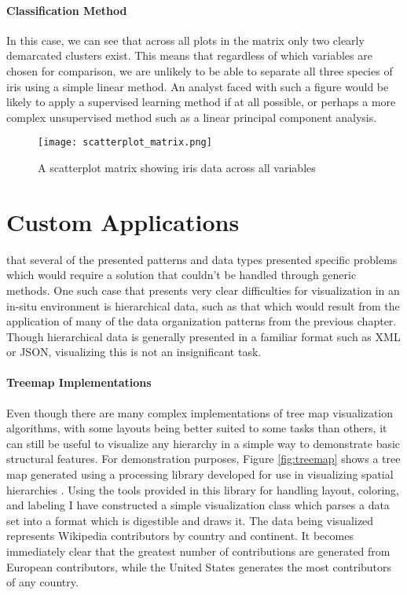 \paragraph{Classification Method}
In this case, we can see that across all plots in the matrix only two clearly demarcated clusters exist. This means that regardless of which variables are chosen for comparison, we are unlikely to be able to separate all three species of iris using a simple linear method. An analyst faced with such a figure would be likely to apply a supervised learning method if at all possible, or perhaps a more complex unsupervised method such as a linear principal component analysis. 

\begin{figure}
	\centering
	\texttt{[image: scatterplot\_matrix.png]}
	\caption{A scatterplot matrix showing iris data across all variables}
	\label{fig:scatterplot_matrix}
\end{figure}

\section{Custom Applications}
 that several of the presented patterns and data types presented specific problems which would require a solution that couldn't be handled through generic methods. One such case that presents very clear difficulties for visualization in an in-situ environment is hierarchical data, such as that which would result from the application of many of the data organization patterns from the previous chapter. Though hierarchical data is generally presented  in a familiar format such as XML or JSON, visualizing this is not an insignificant task.

\paragraph{Treemap Implementations}
Even though there are many complex implementations of tree map visualization algorithms, with some layouts being better suited to some tasks than others, it can still be useful to visualize any hierarchy in a simple way to demonstrate basic structural features. For demonstration purposes, Figure \ref{fig:treemap} shows a tree map generated using a processing library developed for use in visualizing spatial hierarchies \citep{Wood2008} \citep{Slingsby2009}. Using the tools provided in this library for handling layout, coloring, and labeling I have constructed a simple visualization class which parses a data set into a format which is digestible and draws it. The data being visualized represents Wikipedia contributors by country and continent. It becomes immediately clear that the greatest number of contributions are generated from European contributors, while the United States generates the most contributors of any country. 

